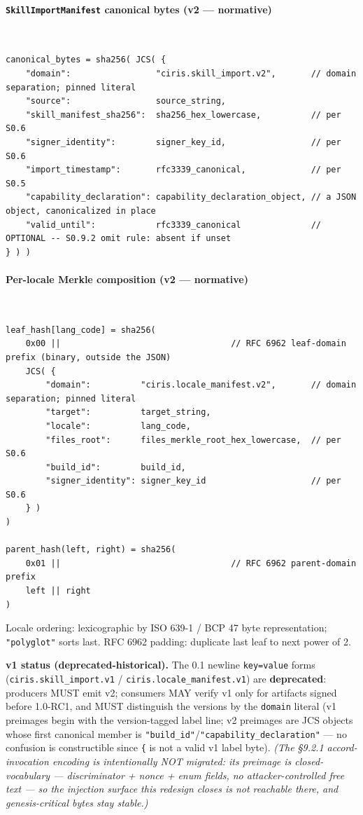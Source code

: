 \documentclass[10pt]{article}
\begin{document}
\paragraph{\texttt{SkillImportManifest} canonical bytes (v2 — normative)}\mbox{}\\


\begin{lstlisting}
canonical_bytes = sha256( JCS( {
    "domain":                 "ciris.skill_import.v2",       // domain separation; pinned literal
    "source":                 source_string,
    "skill_manifest_sha256":  sha256_hex_lowercase,          // per S0.6
    "signer_identity":        signer_key_id,                 // per S0.6
    "import_timestamp":       rfc3339_canonical,             // per S0.5
    "capability_declaration": capability_declaration_object, // a JSON object, canonicalized in place
    "valid_until":            rfc3339_canonical              // OPTIONAL -- S0.9.2 omit rule: absent if unset
} ) )
\end{lstlisting}


\paragraph{Per-locale Merkle composition (v2 — normative)}\mbox{}\\


\begin{lstlisting}
leaf_hash[lang_code] = sha256(
    0x00 ||                                  // RFC 6962 leaf-domain prefix (binary, outside the JSON)
    JCS( {
        "domain":          "ciris.locale_manifest.v2",       // domain separation; pinned literal
        "target":          target_string,
        "locale":          lang_code,
        "files_root":      files_merkle_root_hex_lowercase,  // per S0.6
        "build_id":        build_id,
        "signer_identity": signer_key_id                     // per S0.6
    } )
)

parent_hash(left, right) = sha256(
    0x01 ||                                  // RFC 6962 parent-domain prefix
    left || right
)
\end{lstlisting}

Locale ordering: lexicographic by ISO 639-1 / BCP 47 byte representation; \texttt{"polyglot"} sorts last. RFC 6962 padding: duplicate last leaf to next power of 2.


\textbf{v1 status (deprecated-historical).} The 0.1 newline \texttt{key=value} forms (\texttt{ciris.skill\_import.v1} / \texttt{ciris.locale\_manifest.v1}) are \textbf{deprecated}: producers MUST emit v2; consumers MAY verify v1 only for artifacts signed before 1.0-RC1, and MUST distinguish the versions by the \texttt{domain} literal (v1 preimages begin with the version-tagged label line; v2 preimages are JCS objects whose first canonical member is \texttt{"build\_id"}/\texttt{"capability\_declaration"} — no confusion is constructible since \texttt{\{} is not a valid v1 label byte). \textit{(The §9.2.1 accord-invocation encoding is intentionally NOT migrated: its preimage is closed-vocabulary — discriminator + nonce + enum fields, no attacker-controlled free text — so the injection surface this redesign closes is not reachable there, and genesis-critical bytes stay stable.)}
\end{document}
